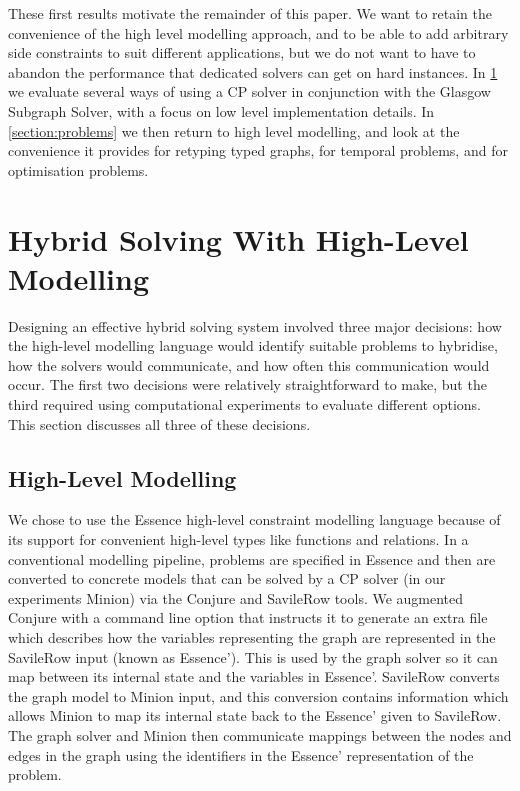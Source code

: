 \documentclass[runningheads]{llncs}
\begin{document}
These first results motivate the remainder of this paper. We want to retain the convenience of the
high level modelling approach, and to be able to add arbitrary side constraints to suit different
applications, but we do not want to have to abandon the performance that dedicated solvers can get
on hard instances. In \cref{section:hybrid} we evaluate several ways of using a CP solver in
conjunction with the Glasgow Subgraph Solver, with a focus on low level implementation details. In
\cref{section:problems} we then return to high level modelling, and look at the convenience it
provides for retyping typed graphs, for temporal problems, and for optimisation problems.

\section{Hybrid Solving With High-Level Modelling}\label{section:hybrid}

Designing an effective hybrid solving system involved three major decisions: how the high-level
modelling language would identify suitable problems to hybridise, how the solvers would communicate,
and how often this communication would occur. The first two decisions were relatively
straightforward to make, but the third required using computational experiments to evaluate
different options. This section discusses all three of these decisions.

\subsection{High-Level Modelling}

We chose to use the Essence high-level constraint modelling language
\cite{DBLP:journals/constraints/FrischHJHM08} because of its support for convenient high-level types
like functions and relations. In a conventional modelling pipeline, problems are specified in
Essence and then are converted to concrete models that can be solved by a CP solver (in our
experiments Minion) via the Conjure and SavileRow tools. We augmented Conjure with a command line
option that instructs it to generate an extra file which describes how the variables representing
the graph are represented in the SavileRow input (known as Essence'). This is used by the graph
solver so it can map between its internal state and the variables in Essence'.  SavileRow converts
the graph model to Minion input, and this conversion contains information which allows Minion to map
its internal state back to the Essence' given to SavileRow. The graph solver and Minion then
communicate mappings between the nodes and edges in the graph using the identifiers in the Essence'
representation of the problem.
\end{document}
